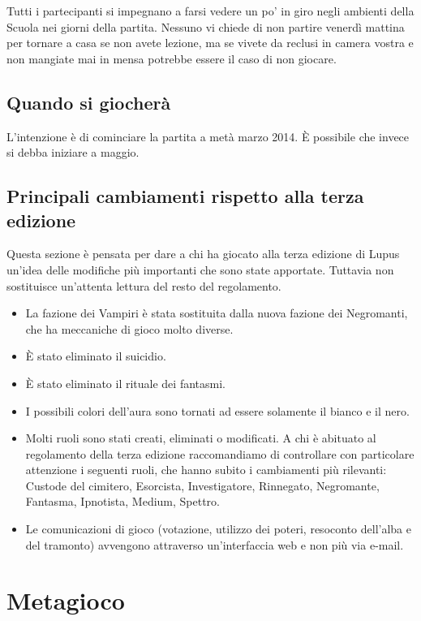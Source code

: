 \documentclass[a4paper,10pt]{article}
\begin{document}
Tutti i partecipanti si impegnano a farsi vedere un po' in giro negli ambienti della Scuola nei giorni della partita. Nessuno vi chiede di non partire venerdì mattina per tornare a casa se non avete lezione, ma se vivete da reclusi in camera vostra e non mangiate mai in mensa potrebbe essere il caso di non giocare.


\subsection{Quando si giocherà}

L'intenzione è di cominciare la partita a metà marzo 2014. È possibile che invece si debba iniziare a maggio.


\subsection{Principali cambiamenti rispetto alla terza edizione}

Questa sezione è pensata per dare a chi ha giocato alla terza edizione di Lupus un'idea delle modifiche più importanti che sono state apportate. Tuttavia non sostituisce un'attenta lettura del resto del regolamento.

\begin{itemize}
 \item La fazione dei Vampiri è stata sostituita dalla nuova fazione dei Negromanti, che ha meccaniche di gioco molto diverse.
 \item È stato eliminato il suicidio.
 \item È stato eliminato il rituale dei fantasmi.
 \item I possibili colori dell'aura sono tornati ad essere solamente il bianco e il nero.
 \item Molti ruoli sono stati creati, eliminati o modificati. A chi è abituato al regolamento della terza edizione raccomandiamo di controllare con particolare attenzione i seguenti ruoli, che hanno subito i cambiamenti più rilevanti: Custode del cimitero, Esorcista, Investigatore, Rinnegato, Negromante, Fantasma, Ipnotista, Medium, Spettro.
 \item Le comunicazioni di gioco (votazione, utilizzo dei poteri, resoconto dell'alba e del tramonto) avvengono attraverso un'interfaccia web e non più via e-mail.
\end{itemize}



\pagebreak
\section{Metagioco}
\end{document}
